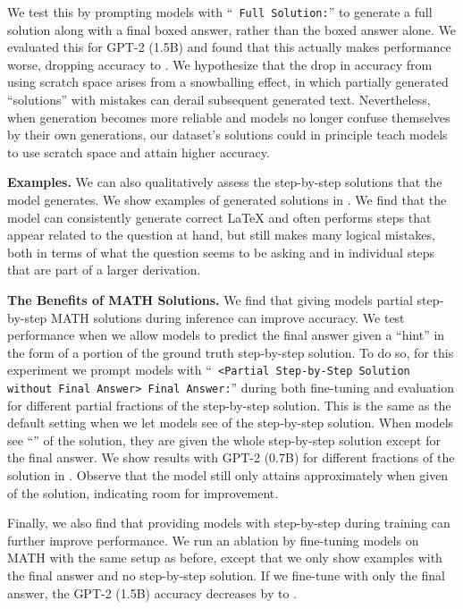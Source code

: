 \documentclass{article}
\begin{document}
We test this by prompting models with ``\texttt{ Full Solution:}'' to generate a full solution along with a final boxed answer, rather than the boxed answer alone. We evaluated this for GPT-2 (1.5B) and found that this actually makes performance worse, dropping accuracy to . We hypothesize that the drop in accuracy from using scratch space arises from a snowballing effect, in which partially generated ``solutions'' with mistakes can derail subsequent generated text. Nevertheless, when generation becomes more reliable and models no longer confuse themselves by their own generations, our dataset's solutions could in principle teach models to use scratch space and attain higher accuracy.

\textbf{Examples.}\quad
We can also qualitatively assess the step-by-step solutions that the model generates. We show examples of generated solutions in .
We find that the model can consistently generate correct \LaTeX{} and often performs steps that appear related to the question at hand, but still makes many logical mistakes, both in terms of what the question seems to be asking and in individual steps that are part of a larger derivation. 

\textbf{The Benefits of MATH Solutions.}\quad
We find that giving models partial step-by-step MATH solutions during inference can improve accuracy.
We test performance when we allow models to predict the final answer given a ``hint'' in the form of a portion of the ground truth step-by-step solution. 
To do so, for this experiment we prompt models with ``\texttt{ <Partial Step-by-Step Solution without Final Answer> Final Answer:}'' during both fine-tuning and evaluation for different partial fractions of the step-by-step solution. 
This is the same as the default setting when we let models see  of the step-by-step solution. 
When models see ``'' of the solution, they are given the whole step-by-step solution except for the final answer. 
We show results with GPT-2 (0.7B) for different fractions of the solution in . Observe that the model still only attains approximately  when given  of the solution, indicating room for improvement.

Finally, we also find that providing models with step-by-step during training can further improve performance. We run an ablation by fine-tuning models on MATH with the same setup as before, except that we only show examples with the final answer and no step-by-step solution. If we fine-tune with only the final answer, the GPT-2 (1.5B) accuracy decreases by  to .
\end{document}
